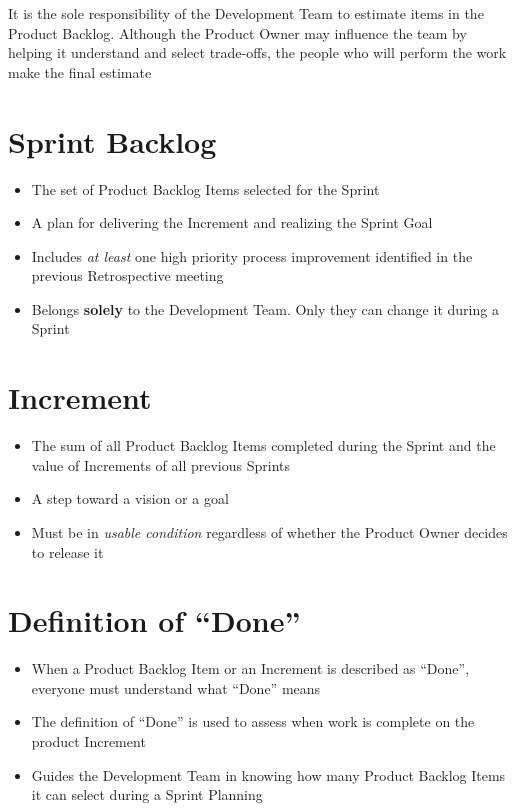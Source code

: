 \documentclass[a4paper,11pt,twocolumn]{article}
\begin{document}
\begin{tcolorbox}[colback=black!8!white,colframe=gray!50!black,title=Note,sharp corners,fonttitle=\normalsize\bfseries,fontupper=\normalsize,left=0.7em,right=0.7em]
	It is the sole responsibility of the Development Team to estimate items in the Product Backlog. Although the Product Owner may influence the team by helping it understand and select trade-offs, the people who will perform the work make the final estimate
\end{tcolorbox}

\section*{Sprint Backlog}
\begin{itemize}
	\item The set of Product Backlog Items selected for the Sprint
	\item A plan for delivering the Increment and realizing the Sprint Goal
	\item Includes \textit{at least} one high priority process improvement identified in the previous Retrospective meeting
	\item Belongs \textbf{solely} to the Development Team. Only they can change it during a Sprint
\end{itemize}

\section*{Increment}
\begin{itemize}
	\item The sum of all Product Backlog Items completed during the Sprint and the value of Increments of all previous Sprints
	\item A step toward a vision or a goal
	\item Must be in \textit{usable condition} regardless of whether the Product Owner decides to release it
\end{itemize}

\section*{Definition of ``Done''}
\begin{itemize}
	\item When a Product Backlog Item or an Increment is described as ``Done'', everyone must understand what ``Done'' means
	\item The definition of ``Done'' is used to assess when work is complete on the product Increment
    \item Guides the Development Team in knowing how many Product Backlog Items it can select during a Sprint Planning
\end{itemize}
\end{document}
